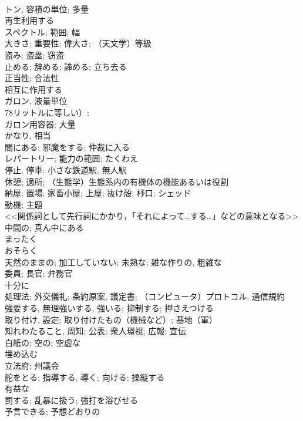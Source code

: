 \documentclass[8pt]{extreport}
\begin{document}
\begin{CJK}{UTF8}{min}
\\	トン, 容積の単位; 多量	
\\	再生利用する	
\\	スペクトル; 範囲; 幅	
\\	大きさ; 重要性; 偉大さ; （天文学）等級	
\\	盗み; 盗塁; 窃盗	
\\	止める; 辞める; 諦める; 立ち去る	
\\	正当性; 合法性	
\\	相互に作用する	
\\	ガロン, 液量単位
\\	78リットルに等しい）; 
\\	ガロン用容器; 大量	
\\	かなり, 相当	
\\	間にある; 邪魔をする; 仲裁に入る	
\\	レパートリー; 能力の範囲; たくわえ	
\\	停止, 停車; 小さな鉄道駅, 無人駅	
\\	休憩; 適所; （生態学）生態系内の有機体の機能あるいは役割	
\\	納屋; 置場; 家畜小屋; 上屋; 抜け殻; 杼口; シェッド	
\\	動機; 主題	
\\	<<関係詞として先行詞にかかり，「それによって…する…」などの意味となる>>	
\\	中間の; 真ん中にある	
\\	まったく	
\\	おそらく	
\\	天然のままの; 加工していない; 未熟な; 雑な作りの, 粗雑な	
\\	委員; 長官; 弁務官	
\\	十分に	
\\	処理法; 外交儀礼; 条約原案, 議定書; （コンピュータ）プロトコル, 通信規約	
\\	強要する, 無理強いする, 強いる; 抑制する; 押さえつける	
\\	取り付け, 設定; 取り付けたもの（機械など）; 基地（軍）	
\\	知れわたること, 周知; 公表; 衆人環視; 広報; 宣伝	
\\	白紙の; 空の; 空虚な	
\\	埋め込む	
\\	立法府; 州議会	
\\	舵をとる; 指導する, 導く; 向ける; 操縦する	
\\	有益な	
\\	罰する; 乱暴に扱う; 強打を浴びせる	
\\	予言できる; 予想どおりの	

\end{CJK}
\end{document}
